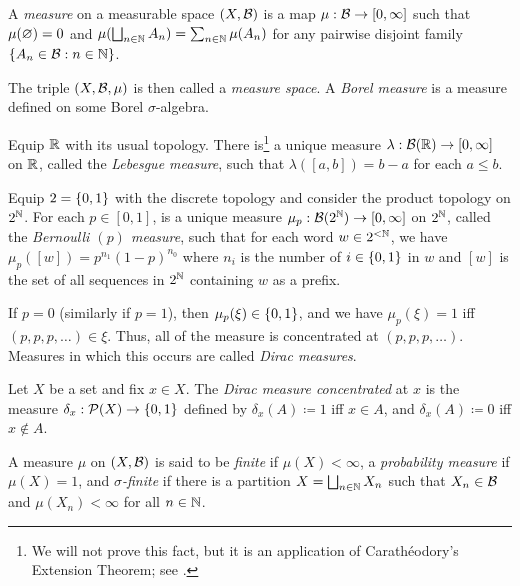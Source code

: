 \documentclass[reqno, twoside]{article}
\begin{document}
    \begin{definition}
        A \textit{measure} on a measurable space $(X,\mathcal{B})$ is a map $\mu:\mathcal{B}\to[0,\infty]$ such that $\mu(\varnothing)=0$ and $\mu(\bigsqcup_{n\in\mathbb{N}}A_n)=\sum_{n\in\mathbb{N}}\mu(A_n)$ for any pairwise disjoint family $\left\{A_n\in\mathcal{B}: n\in\mathbb{N}\right\}$.

        The triple $(X,\mathcal{B},\mu)$ is then called a \textit{measure space}. A \textit{Borel measure} is a measure defined on some Borel $\sigma$-algebra.
    \end{definition}

    \begin{example}[Lebesgue]\label{exa:lebesgue}
        Equip $\mathbb{R}$ with its usual topology. There is\footnote{We will not prove this fact, but it is an application of Carathéodory's Extension Theorem; see \cite[Lecture 4]{Tse23}.} a unique measure $\lambda:\mathcal{B}(\mathbb{R})\to[0,\infty]$ on $\mathbb{R}$, called the \textit{Lebesgue measure}, such that $\lambda([a,b])=b-a$ for each $a\leq b$.
    \end{example}

    \begin{example}[Bernoulli]\label{exa:bernoulli}
        Equip $2=\left\{0,1\right\}$ with the discrete topology and consider the product topology on $2^{\mathbb{N}}$. For each $p\in[0,1]$, is a unique measure $\mu_p:\mathcal{B}(2^{\mathbb{N}})\to[0,\infty]$ on $2^{\mathbb{N}}$, called the \textit{Bernoulli $(p)$ measure}, such that for each word $w\in2^{<\mathbb{N}}$, we have $\mu_p([w])=p^{n_1}(1-p)^{n_0}$ where $n_i$ is the number of $i\in\left\{0,1\right\}$ in $w$ and $[w]$ is the set of all sequences in $2^{\mathbb{N}}$ containing $w$ as a prefix.
    \end{example}

    If $p=0$ (similarly if $p=1$), then $\mu_p(\xi)\in\left\{0,1\right\}$, and we have $\mu_p(\xi)=1$ iff $(p,p,p,\ldots)\in\xi$. Thus, all of the measure is concentrated at $(p,p,p,\ldots)$. Measures in which this occurs are called \textit{Dirac measures}.

    \begin{example}[Dirac]
        Let $X$ be a set and fix $x\in X$. The \textit{Dirac measure concentrated} at $x$ is the measure $\delta_x:\mathcal{P}(X)\to\left\{0,1\right\}$ defined by $\delta_x(A)\coloneqq1$ iff $x\in A$, and $\delta_x(A)\coloneqq0$ iff $x\not\in A$.
    \end{example}

    \begin{definition}
        A measure $\mu$ on $(X,\mathcal{B})$ is said to be \textit{finite} if $\mu(X)<\infty$, a \textit{probability measure} if $\mu(X)=1$, and \textit{$\sigma$-finite} if there is a partition $X=\bigsqcup_{n\in\mathbb{N}}X_n$ such that $X_n\in\mathcal{B}$ and $\mu(X_n)<\infty$ for all $n\in\mathbb{N}$.
    \end{definition}
\end{document}
